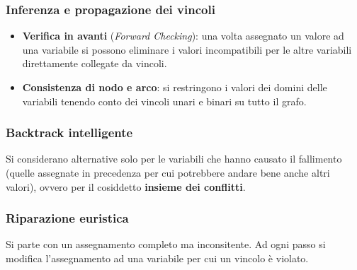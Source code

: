 \subsubsection{Inferenza e propagazione dei vincoli}
\begin{itemize}
	\item \textbf{Verifica in avanti} (\emph{Forward Checking}): una volta assegnato un valore ad una variabile si possono eliminare
	      i valori incompatibili per le altre variabili direttamente collegate da vincoli.
	\item \textbf{Consistenza di nodo e arco}: si restringono i valori dei domini delle variabili tenendo conto dei vincoli unari e
	      binari su tutto il grafo.
\end{itemize}

\subsubsection{Backtrack intelligente}
Si considerano alternative solo per le variabili che hanno causato il fallimento (quelle assegnate in precedenza per cui potrebbere andare
bene anche altri valori), ovvero per il cosiddetto \textbf{insieme dei conflitti}.

\subsubsection{Riparazione euristica}
Si parte con un assegnamento completo ma inconsitente. Ad ogni passo si modifica l'assegnamento ad una variabile per cui un vincolo \`e violato.
